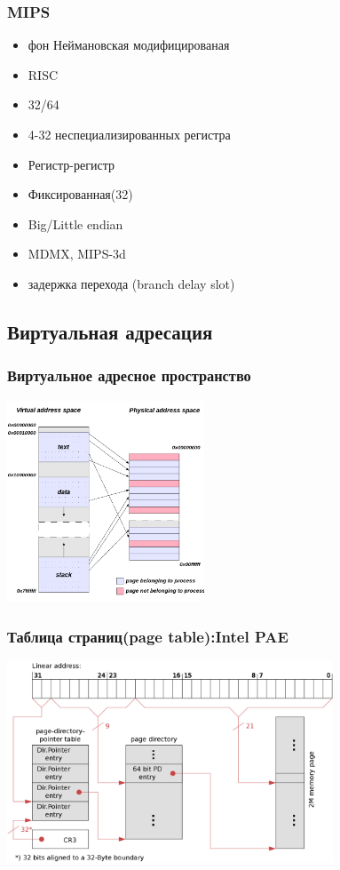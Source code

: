\begin{frame}
  \frametitle{MIPS}
  \begin{itemize}
      \item фон Неймановская модифицированая
      \item RISC
      \item 32/64
      \item 4-32 неспециализированных регистра
      \item Регистр-регистр
      \item Фиксированная(32)
      \item Big/Little endian
      \item MDMX, MIPS-3d
      \item задержка перехода (branch delay slot)
   \end{itemize}
\end{frame}
\subsection{Виртуальная адресация}
\begin{frame}
  \frametitle{Виртуальное адресное пространство}
  \begin{center}
    \includegraphics[height=6cm]{slides/processor_arch/Virtual_address_space_and_physical_address_space_relationship.png}
  \end{center}
\end{frame}
\begin{frame}
  \frametitle{Таблица страниц(page table):Intel PAE}
  \begin{center}
    \includegraphics[height=6cm]{slides/processor_arch/X86_Paging_PAE_2M.png}
  \end{center}
\end{frame}

